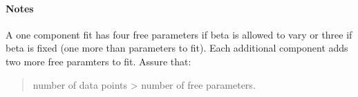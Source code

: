 \documentclass[a4paper,10pt,english]{sphinxmanual}
\begin{document}
\begin{fulllineitems}
\paragraph{Notes}

A one component fit has four free parameters if beta is allowed to vary or
three if beta is fixed (one more than parameters to fit). Each additional
component adds two more free paramters to fit.
Assure that:
\begin{quote}

number of data points \textgreater{} number of free parameters.
\end{quote}

\end{fulllineitems}

\end{document}
